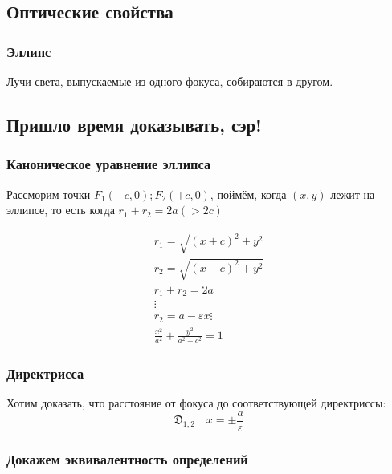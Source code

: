 \documentclass[12pt, a4paper]{article}
\begin{document}
    \subsection{Оптические свойства}

    \subsubsection{Эллипс}
    Лучи света, выпускаемые из одного фокуса, собираются в другом.



    \subsection{Пришло время доказывать, сэр!}

    \subsubsection{Каноническое уравнение эллипса}

    Рассморим точки $F_1 (-c, 0); F_2 (+c, 0)$, поймём, когда $(x, y)$ 
    лежит на эллипсе, то есть когда $r_1  + r_2 = 2a (> 2c)$

    \begin{gather}
        r_1 = \sqrt{(x + c)^2 +  y^2} \\
        r_2 = \sqrt{(x - c)^2 +  y^2} \\
        r_1 + r_2 = 2a \\
        \vdots \\
        r_2 = a - \varepsilon x
        \vdots \\
        \frac{x^2}{a^2} + \frac{y^2}{a^2 - c^2} = 1
    \end{gather}

    \subsubsection{Директрисса}

    Хотим доказать, что расстояние от фокуса до соответствующей директриссы:
    \begin{equation}
        \mathfrak{D}_{1, 2}\quad x = \pm \frac {a}{\varepsilon}
    \end{equation}

    \subsubsection{Докажем эквивалентность определений}
\end{document}
